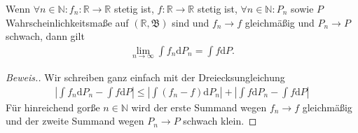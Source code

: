 \begin{lemma}
    Wenn $\forall n\in\mathbb{N}:f_n:\mathbb{R}\to\mathbb{R}$ stetig ist, $f:\mathbb{R}\to\mathbb{R}$ stetig ist, $\forall n\in\mathbb{N}:P_n$ sowie $P$ Wahrscheinlichkeitsmaße auf $(\mathbb{R},\mathfrak{B})$ sind und $f_n\to f$ gleichmäßig und $P_n\to P$ schwach, dann gilt
    \begin{align*}
        \lim_{n\to\infty}\int f_n\mathrm{d}P_n=\int f\mathrm{d}P.
    \end{align*}
\end{lemma}
\begin{proof}[Beweis.]
    Wir schreiben ganz einfach mit der Dreiecksungleichung
    \begin{align*}
        \left\vert\int f_n\mathrm{d}P_n-\int f\mathrm{d}P\right\vert\leq\left\vert\int (f_n-f)\mathrm{d}P_n\right\vert+\left\vert\int f\mathrm{d}P_n-\int f\mathrm{d}P\right\vert
    \end{align*}
    Für hinreichend gorße $n\in\mathbb{N}$ wird der erste Summand wegen $f_n\to f$ gleichmäßig und der zweite Summand wegen $P_n\to P$ schwach klein.
\end{proof}